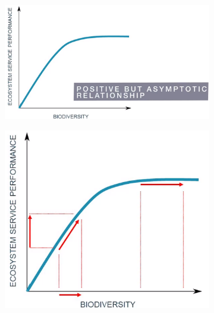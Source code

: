 \documentclass[../summary.tex]{subfiles}
\begin{document}
\begin{figure}[H]
	\centering
	\begin{subfigure}[b]{0.4\textwidth}
		\centering
		\includegraphics[width=\textwidth]{../images/ecosystem_service_cascade_1.png}
		\caption{}
		\label{fig:ecosystemserviceperformance1}
	\end{subfigure}
	\hfill
	\begin{subfigure}[b]{0.25\textwidth}
		\centering
		\includegraphics[width=\textwidth]{../images/ecosystem_service_cascade_2.png}
		\caption{}
		\label{fig:ecosystemserviceperformance2}
	\end{subfigure}
	\hfill
	\begin{subfigure}[b]{0.25\textwidth}
		\centering

\end{subfigure}
\end{figure}
\end{document}
